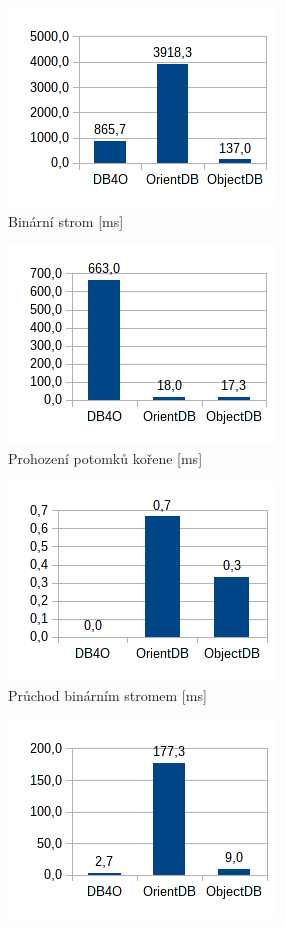 \begin{figure}[!h]\ContinuedFloat
  \begin{subfigure}[b]{0.5\textwidth}
  \includegraphics[]{obr/bench/oodbms9}
  \caption{Binární strom [ms]}\label{img:oodbms9}
  \end{subfigure}
  \begin{subfigure}[b]{0.5\textwidth}
  \includegraphics[]{obr/bench/oodbms10}
  \caption{Prohození potomků kořene [ms]}\label{img:oodbms10}
  \end{subfigure}
  \begin{subfigure}[b]{0.5\textwidth}
  \includegraphics[]{obr/bench/oodbms11}
  \caption{Průchod binárním stromem [ms]}\label{img:oodbms11}
  \end{subfigure}
  \begin{subfigure}[b]{0.5\textwidth}
  \includegraphics[]{obr/bench/oodbms12}

\end{subfigure}
\end{figure}
